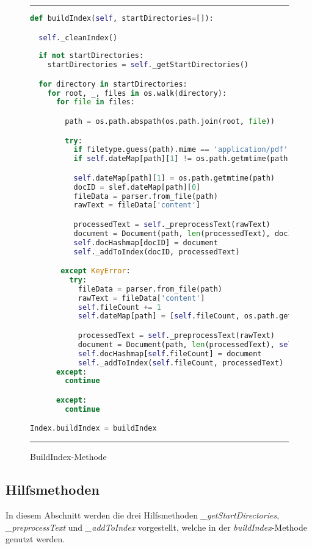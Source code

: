 \begin{figure}
	\rule{\textwidth}{0.4pt}
		\begin{lstlisting}[language=Python]
def buildIndex(self, startDirectories=[]):

  self._cleanIndex()
 
  if not startDirectories:
    startDirectories = self._getStartDirectories()

  for directory in startDirectories:
    for root, _, files in os.walk(directory):
      for file in files:

        path = os.path.abspath(os.path.join(root, file))

        try:
          if filetype.guess(path).mime == 'application/pdf':
          if self.dateMap[path][1] != os.path.getmtime(path):

          self.dateMap[path][1] = os.path.getmtime(path)
          docID = slef.dateMap[path][0]
          fileData = parser.from_file(path)
          rawText = fileData['content']

          processedText = self._preprocessText(rawText)
          document = Document(path, len(processedText), docID, processedText)
          self.docHashmap[docID] = document
          self._addToIndex(docID, processedText)

       except KeyError:
         try:
           fileData = parser.from_file(path)
           rawText = fileData['content']
           self.fileCount += 1
           self.dateMap[path] = [self.fileCount, os.path.getmtime(path)]

           processedText = self._preprocessText(rawText)
           document = Document(path, len(processedText), self.fileCount, processedText)
           self.docHashmap[self.fileCount] = document
           self._addToIndex(self.fileCount, processedText)
      except:
        continue

      except:
        continue

Index.buildIndex = buildIndex
		\end{lstlisting}
	\rule{\textwidth}{0.4pt}
	\caption{BuildIndex-Methode}
	\label{fig:build}
\end{figure}

\subsection{Hilfsmethoden}\label{hilfsmethoden}

In diesem Abschnitt werden die drei Hilfsmethoden \textit{\_getStartDirectories}, \textit{\_preprocessText} und \textit{\_addToIndex} vorgestellt, welche in der \textit{buildIndex}-Methode genutzt werden.

